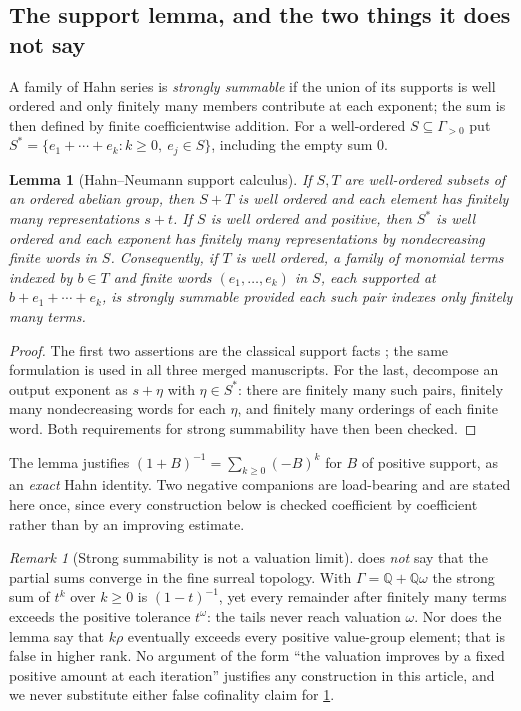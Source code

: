 \documentclass[11pt,letterpaper]{article}
\numberwithin{equation}{section}
\newtheorem{lemma}[theorem]{Lemma}
\theoremstyle{definition}
\theoremstyle{remark}\newtheorem{remark}[theorem]{Remark}
\newcommand{\Q}{\mathbb Q}
\begin{document}
\subsection{The support lemma, and the two things it does not say}
A family of Hahn series is \emph{strongly summable} if the union of its
supports is well ordered and only finitely many members contribute at each
exponent; the sum is then defined by finite coefficientwise addition. For a
well-ordered $S\subseteq\Gamma_{>0}$ put
$S^*=\{e_1+\cdots+e_k:k\ge0,\ e_j\in S\}$, including the empty sum $0$.

\begin{lemma}[Hahn--Neumann support calculus]\label{polynomial:lem:support}
If $S,T$ are well-ordered subsets of an ordered abelian group, then $S+T$ is
well ordered and each element has finitely many representations $s+t$. If
$S$ is well ordered and positive, then $S^*$ is well ordered and each exponent
has finitely many representations by nondecreasing finite words in $S$.
Consequently, if $T$ is well ordered, a family of monomial terms indexed by
$b\in T$ and finite words $(e_1,\ldots,e_k)$ in $S$, each supported at
$b+e_1+\cdots+e_k$, is strongly summable provided each such pair indexes
only finitely many terms.
\end{lemma}
\begin{proof}
The first two assertions are the classical support facts
\cite{polynomial:Neumann}; the same formulation is used in all three merged
manuscripts. For the last, decompose an output exponent as $s+\eta$ with
$\eta\in S^*$: there are finitely many such pairs, finitely many nondecreasing
words for each $\eta$, and finitely many orderings of each finite word. Both
requirements for strong summability have then been checked.
\end{proof}

The lemma justifies $(1+B)^{-1}=\sum_{k\ge0}(-B)^k$ for $B$ of positive
support, as an \emph{exact} Hahn identity. Two negative companions are
load-bearing and are stated here once, since every construction below is
checked coefficient by coefficient rather than by an improving estimate.

\begin{remark}[Strong summability is not a valuation limit]
\label{polynomial:rem:notalimit}
 does \emph{not} say that the partial sums
converge in the fine surreal topology. With $\Gamma=\Q+\Q\omega$ the strong
sum of $t^k$ over $k\ge0$ is $(1-t)^{-1}$, yet every remainder after finitely
many terms exceeds the positive tolerance $t^\omega$: the tails never reach
valuation $\omega$. Nor does the lemma say that $k\rho$ eventually exceeds
every positive value-group element; that is false in higher rank. No argument
of the form ``the valuation improves by a fixed positive amount at each
iteration'' justifies any construction in this article, and we never
substitute either false cofinality claim for
\cref{polynomial:lem:support}.
\end{remark}
\end{document}
